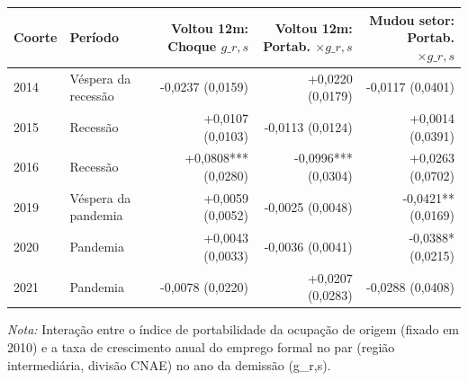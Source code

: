 \providecommand{\toprule}{\hline\hline}
\providecommand{\midrule}{\hline}
\providecommand{\bottomrule}{\hline\hline}
\providecommand{\addlinespace}[1][]{}
{\small
\renewcommand{\arraystretch}{1.12}
\begin{tabular}{llrrr}
\toprule
Coorte & Período & Voltou 12m: Choque $g\_{r,s}$ & Voltou 12m: Portab. $\times g\_{r,s}$ & Mudou setor: Portab. $\times g\_{r,s}$ \\
\midrule
2014 & Véspera da recessão & -0,0237 (0,0159) & +0,0220 (0,0179) & -0,0117 (0,0401) \\
2015 & Recessão & +0,0107 (0,0103) & -0,0113 (0,0124) & +0,0014 (0,0391) \\
2016 & Recessão & +0,0808*** (0,0280) & -0,0996*** (0,0304) & +0,0263 (0,0702) \\
2019 & Véspera da pandemia & +0,0059 (0,0052) & -0,0025 (0,0048) & -0,0421** (0,0169) \\
2020 & Pandemia & +0,0043 (0,0033) & -0,0036 (0,0041) & -0,0388* (0,0215) \\
2021 & Pandemia & -0,0078 (0,0220) & +0,0207 (0,0283) & -0,0288 (0,0408) \\
\bottomrule
\end{tabular}
\vspace{2pt}
\par{\footnotesize \textit{Nota:} Interação entre o índice de portabilidade da ocupação de origem (fixado em 2010) e a taxa de crescimento anual do emprego formal no par (região intermediária, divisão CNAE) no ano da demissão (g\_{r,s}).}
}
